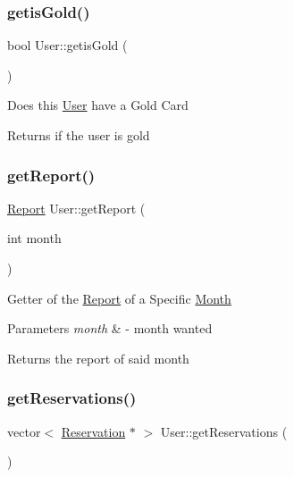 \subsubsection{\texorpdfstring{getis\+Gold()}{getisGold()}}
{\footnotesize\ttfamily bool User\+::getis\+Gold (\begin{DoxyParamCaption}{ }\end{DoxyParamCaption})}

Does this \mbox{\hyperlink{class_user}{User}} have a Gold Card \begin{DoxyReturn}{Returns}
if the user is gold 
\end{DoxyReturn}
\mbox{\label{class_user_ad5f236ca0846ae3fc493609f72d17a70}} 
\subsubsection{\texorpdfstring{get\+Report()}{getReport()}}
{\footnotesize\ttfamily \mbox{\hyperlink{class_report}{Report}} User\+::get\+Report (\begin{DoxyParamCaption}\item[{int}]{month }\end{DoxyParamCaption})}

Getter of the \mbox{\hyperlink{class_report}{Report}} of a Specific \mbox{\hyperlink{class_month}{Month}} 
\begin{DoxyParams}{Parameters}
{\em month} & -\/ month wanted \\
\hline
\end{DoxyParams}
\begin{DoxyReturn}{Returns}
the report of said month 
\end{DoxyReturn}
\mbox{\label{class_user_a7443c5c7b1cca31c8400130568050327}} 
\subsubsection{\texorpdfstring{get\+Reservations()}{getReservations()}}
{\footnotesize\ttfamily vector$<$ \mbox{\hyperlink{class_reservation}{Reservation}} $\ast$ $>$ User\+::get\+Reservations (\begin{DoxyParamCaption}{ }\end{DoxyParamCaption})}



